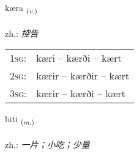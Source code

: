\documentclass[frontgrid, backgrid]{flacards}\usepackage[]{graphicx}\usepackage[]{xcolor}
\begin{document}
\renewcommand{\flhead}{\vskip5pt \fboxsep=0pt {\small\bfseries\footnotesize Sagnorð | 动词}}
\renewcommand{\fcfoot}{\vskip5pt \fboxsep=0pt \hspace{2pt}{\small\bfseries\footnotesize 3K}}

\renewcommand{\blhead}{\vskip5pt {\small\bfseries\footnotesize Sagnorð | 动词 }}
\renewcommand{\bcfoot}{\vskip5pt \hspace{2pt}{\small\bfseries\footnotesize 3K}}


{kæra \small{\textsubscript{(\textit{v.})}} \\[1ex] %
\textphonetic{[cʰaiːra]} \\
zh.: \emph{控告} \\  [2ex]
\renewcommand*{\arraystretch}{0.8}
\begin{tabular}{p{1cm}l}
\textsc{1sg}: & kæri -- kærði -- kært \\ 
\textsc{2sg}: & kærir -- kærðir -- kært \\ 
\textsc{3sg}: & kærir -- kærði -- kært \\ 
\end{tabular}
}

\renewcommand{\flhead}{\vskip5pt \fboxsep=0pt {\small\bfseries\footnotesize Nafnorð | 名词}}
\renewcommand{\fcfoot}{\vskip5pt \fboxsep=0pt \hspace{2pt}{\small\bfseries\footnotesize 3K}}

\renewcommand{\blhead}{\vskip5pt {\small\bfseries\footnotesize Nafnorð | 名词 }}
\renewcommand{\bcfoot}{\vskip5pt \hspace{2pt}{\small\bfseries\footnotesize 3K}}


{biti \small{\textsubscript{(\textit{m.})}} \\[1ex] %
\textphonetic{[pɪːtɪ]} \\
zh.: \emph{一片；小吃；少量} \\  [2ex]
\renewcommand*{\arraystretch}{0.8}
}
\end{document}
